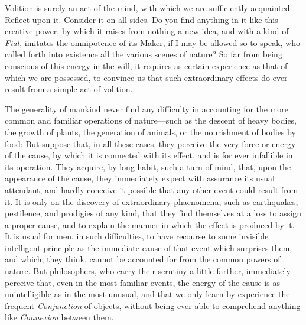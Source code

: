 \documentclass[]{article}
\newcounter{authornote}[page]
\newcommand*{\authornote}[1]{\renewcommand{\thefootnote}{\fnsymbol{footnote}}\stepcounter{authornote}\footnote[\value{authornote}]{#1}\renewcommand{\thefootnote}{\arabic{footnote}}}
\begin{document}
\begin{sectionbody}
\humeparagraph  Volition is surely an act of the mind, with which we are sufficiently acquainted. Reflect upon it. Consider it on all sides. Do you find anything in it like this creative power, by which it raises from nothing a new idea, and with a kind of \emph{Fiat}, imitates the omnipotence of its Maker, if I may be allowed so to speak, who called forth into existence all the various scenes of nature? So far from being conscious of this energy in the will, it requires as certain experience as that of which we are possessed, to convince us that such extraordinary effects do ever result from a simple act of volition.

\humeparagraph  The generality of mankind never find any difficulty in accounting for the more common and familiar operations of nature---such as the descent of heavy bodies, the growth of plants, the generation of animals, or the nourishment of bodies by food: But suppose that, in all these cases, they perceive the very force or energy of the cause, by which it is connected with its effect, and is for ever infallible in its operation. They acquire, by long habit, such a turn of mind, that, upon the appearance of the cause, they immediately expect with assurance its usual attendant, and hardly conceive it possible that any other event could result from it. It is only on the discovery of extraordinary phaenomena, such as earthquakes, pestilence, and prodigies of any kind, that they find themselves at a loss to assign a proper cause, and to explain the manner in which the effect is produced by it. It is usual for men, in such difficulties, to have recourse to some invisible intelligent principle%
 as the immediate cause of that event which surprises them, and which, they think, cannot be accounted for from the common powers of nature. But philosophers, who carry their scrutiny a little farther, immediately perceive that, even in the most familiar events, the energy of the cause is as unintelligible as in the most unusual, and that we only learn by experience the frequent \emph{Conjunction} of objects, without being ever able to comprehend anything like \emph{Connexion} between them.


\end{sectionbody}
\end{document}
